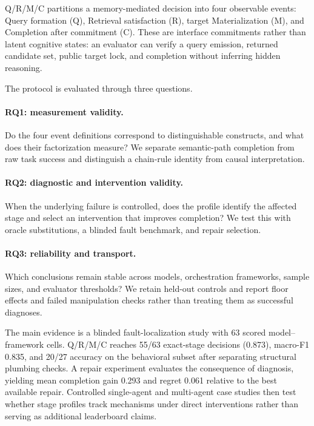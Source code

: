 \documentclass{article}
\newcommand{\qrmc}{Q/R/M/C}
\begin{document}
\qrmc{} partitions a memory-mediated decision into four observable events: Query formation (Q), Retrieval satisfaction (R), target Materialization (M), and Completion after commitment (C). These are interface commitments rather than latent cognitive states: an evaluator can verify a query emission, returned candidate set, public target lock, and completion without inferring hidden reasoning.

The protocol is evaluated through three questions.

\paragraph{RQ1: measurement validity.} Do the four event definitions correspond to distinguishable constructs, and what does their factorization measure? We separate semantic-path completion from raw task success and distinguish a chain-rule identity from causal interpretation.

\paragraph{RQ2: diagnostic and intervention validity.} When the underlying failure is controlled, does the profile identify the affected stage and select an intervention that improves completion? We test this with oracle substitutions, a blinded fault benchmark, and repair selection.

\paragraph{RQ3: reliability and transport.} Which conclusions remain stable across models, orchestration frameworks, sample sizes, and evaluator thresholds? We retain held-out controls and report floor effects and failed manipulation checks rather than treating them as successful diagnoses.

The main evidence is a blinded fault-localization study with 63 scored model--framework cells. \qrmc{} reaches 55/63 exact-stage decisions (0.873), macro-F1 0.835, and 20/27 accuracy on the behavioral subset after separating structural plumbing checks. A repair experiment evaluates the consequence of diagnosis, yielding mean completion gain 0.293 and regret 0.061 relative to the best available repair. Controlled single-agent and multi-agent case studies then test whether stage profiles track mechanisms under direct interventions rather than serving as additional leaderboard claims.
\end{document}
